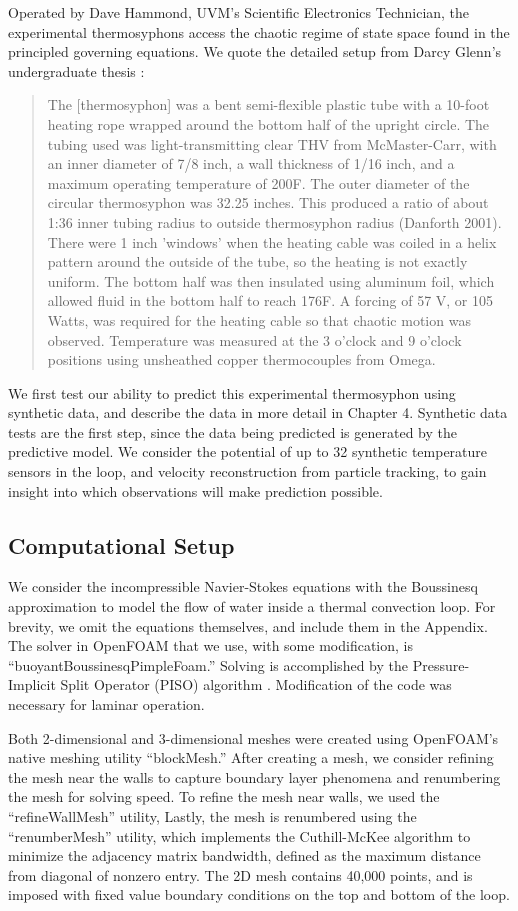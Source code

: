Operated by Dave Hammond, UVM's Scientific Electronics Technician, the experimental thermosyphons access the chaotic regime of state space found in the principled governing equations.
We quote the detailed setup from Darcy Glenn's undergraduate thesis \cite{glenn2013}:
\begin{quote}
The [thermosyphon] was a bent semi-flexible plastic tube with a 10-foot heating rope wrapped around the bottom half of the upright circle.
The tubing used was light-transmitting clear THV from McMaster-Carr, with an inner diameter of 7/8 inch, a wall thickness of 1/16 inch, and a maximum operating temperature of 200F.
The outer diameter of the circular thermosyphon was 32.25 inches.
This produced a ratio of about 1:36 inner tubing radius to outside thermosyphon radius (Danforth 2001).
There were 1 inch 'windows' when the heating cable was coiled in a helix pattern around the outside of the tube, so the heating is not exactly uniform.
The bottom half was then insulated using aluminum foil, which allowed fluid in the bottom half to reach 176F.
A forcing of 57 V, or 105 Watts, was required for the heating cable so that chaotic motion was observed.
Temperature was measured at the 3 o'clock and 9 o'clock positions using unsheathed copper thermocouples from Omega.
\end{quote}
We first test our ability to predict this experimental thermosyphon using synthetic data, and describe the data in more detail in Chapter 4.
Synthetic data tests are the first step, since the data being predicted is generated by the predictive model.
We consider the potential of up to 32 synthetic temperature sensors in the loop, and velocity reconstruction from particle tracking, to gain insight into which observations will make prediction possible.

\subsection{Computational Setup}
We consider the incompressible Navier-Stokes equations with the Boussinesq approximation to model the flow of water inside a thermal convection loop.
For brevity, we omit the equations themselves, and include them in the Appendix.
The solver in OpenFOAM that we use, with some modification, is ``buoyantBoussinesqPimpleFoam.''
Solving is accomplished by the Pressure-Implicit Split Operator (PISO) algorithm \cite{issa1986solution}.
Modification of the code was necessary for laminar operation.

Both 2-dimensional and 3-dimensional meshes were created using OpenFOAM's native meshing utility ``blockMesh.''
After creating a mesh, we consider refining the mesh near the walls to capture boundary layer phenomena and renumbering the mesh for solving speed.
To refine the mesh near walls, we used the ``refineWallMesh'' utility, 
Lastly, the mesh is renumbered using the ``renumberMesh'' utility, which implements the Cuthill-McKee algorithm to minimize the adjacency matrix bandwidth, defined as the maximum distance from diagonal of nonzero entry.
The 2D mesh contains 40,000 points, and is imposed with fixed value boundary conditions on the top and bottom of the loop.

